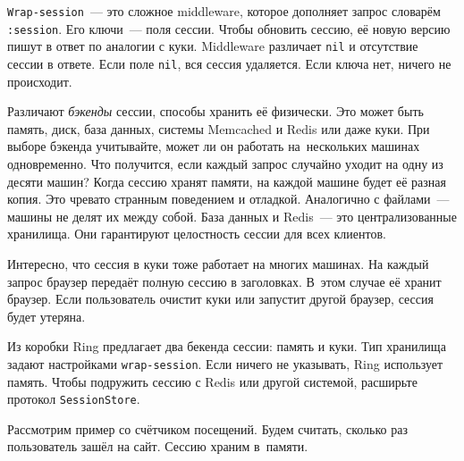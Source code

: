 
\verb|Wrap-session|~--- это сложное middleware, которое дополняет запрос словарём
\verb|:session|. Его ключи~--- поля сессии. Чтобы обновить сессию, её новую
версию пишут в ответ по аналогии с куки. Middleware различает \verb|nil| и
отсутствие сессии в ответе. Если поле \verb|nil|, вся сессия удаляется. Если
ключа нет, ничего не происходит.


Различают \emph{бэкенды} сессии, способы хранить её физически. Это может
быть память, диск, база данных, системы Memcached и Redis или даже куки. При
выборе бэкенда учитывайте, может ли он работать на~нескольких машинах
одновременно. Что получится, если каждый запрос случайно уходит на одну из
десяти машин? Когда сессию хранят памяти, на каждой машине будет её разная
копия. Это чревато странным поведением и отладкой. Аналогично с файлами~---
машины не делят их между собой. База данных и Redis~--- это централизованные
хранилища. Они гарантируют целостность сессии для всех клиентов.

Интересно, что сессия в куки тоже работает на многих машинах. На каждый запрос
браузер передаёт полную сессию в заголовках. В~этом случае её хранит
браузер. Если пользователь очистит куки или запустит другой браузер, сессия
будет утеряна.

Из коробки Ring предлагает два бекенда сессии: память и куки. Тип хранилища
задают настройками \verb|wrap-session|. Если ничего не указывать, Ring
использует память. Чтобы подружить сессию с Redis или другой системой, расширьте
протокол \verb|SessionStore|.

Рассмотрим пример со счётчиком посещений. Будем считать, сколько раз
пользователь зашёл на сайт. Сессию храним в~памяти.


\begin{english}
\end{english}

